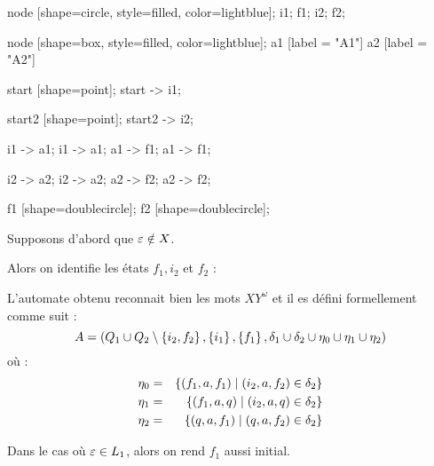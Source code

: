 \begin{proofI}
\begin{itemize}
\begin{automata}
{				      node [shape=circle, style=filled, color=lightblue];
				      i1;
				      f1;
				      i2;
				      f2;

				      node [shape=box, style=filled, color=lightblue];
				      a1 [label = "A1"]
				      a2 [label = "A2"]

				      start [shape=point];
				      start -> i1;


				      start2 [shape=point];
				      start2 -> i2;

				      i1 -> a1;
				      i1 -> a1;
				      a1 -> f1;
				      a1 -> f1;


				      i2 -> a2;
				      i2 -> a2;
				      a2 -> f2;
				      a2 -> f2;

				      f1 [shape=doublecircle];
				      f2 [shape=doublecircle];
			      }
		      \end{automata}

		      Supposons d'abord que $\varepsilon \notin X$.

		      Alors on identifie les états $f_1,i_2$ et $f_2$ :

		      \begin{automata}
		      \end{automata}

		      L'automate obtenu reconnait bien les mots $XY^{\omega}$ et il es défini formellement comme suit :
		      $$ A = ( Q_1 \cup Q_2 \setminus \left\{i_2,f_2\right\}, \left\{i_1\right\}, \left\{f_1\right\}, \delta_1 \cup \delta_2 \cup \eta_0 \cup \eta_1 \cup \eta_2)$$
		      où :
		      \begin{eqnarray*}
			      \eta_0 &=& \left\{(f_1,a,f_1) \mid (i_2,a,f_2) \in \delta_2\right\} \\
			      \eta_1 &=& \left\{(f_1,a,q) \mid (i_2,a,q) \in \delta_2\right\} \\
			      \eta_2 &=& \left\{(q,a,f_1) \mid (q,a,f_2) \in \delta_2\right\}
		      \end{eqnarray*}


		      Dans le cas où $\varepsilon \in L_1$, alors on rend $f_1$ aussi initial.
	\end{itemize}
\end{proofI}

